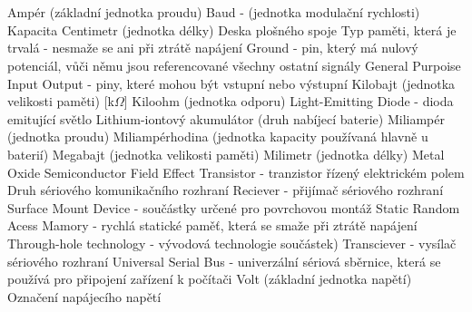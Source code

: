 \cleardoublepage
\chapter*{\listofabbrevname}
{}

\begin{acronym}
		{Ampér (základní jednotka proudu)}
		{Baud - (jednotka modulační rychlosti)}
		{Kapacita}
		{Centimetr (jednotka délky)}
		{Deska plošného spoje}
		{Typ paměti, která je trvalá - nesmaže se ani při ztrátě napájení}
		{Ground - pin, který má nulový potenciál, vůči němu jsou referencované všechny ostatní signály}
		{General Purpoise Input Output - piny, které mohou být vstupní nebo výstupní}
		{Kilobajt (jednotka velikosti paměti)}
	\acro{}[k$\Omega$]
		{Kiloohm (jednotka odporu)}	
		{Light-Emitting Diode - dioda emitující světlo}
		{Lithium-iontový akumulátor (druh nabíjecí baterie)}
		{Miliampér (jednotka proudu)}
		{Miliampérhodina (jednotka kapacity používaná hlavně u baterií)}
		{Megabajt (jednotka velikosti paměti)}
		{Milimetr (jednotka délky)}
		{Metal Oxide Semiconductor Field Effect Transistor - tranzistor řízený elektrickém polem}	
		{Druh sériového komunikačního rozhraní} 
		{Reciever - přijímač sériového rozhraní}
		{Surface Mount Device - součástky určené pro povrchovou montáž} 
		{Static Random Acess Mamory - rychlá statické paměť, která se smaže při ztrátě napájení}	
		{Through-hole technology - vývodová technologie součástek)}
		{Transciever - vysílač sériového rozhraní} 
		{Universal Serial Bus - univerzální sériová sběrnice, která se používá pro připojení zařízení k počítači}
		{Volt (základní jednotka napětí)}
		{Označení napájecího napětí}

\end{acronym}

